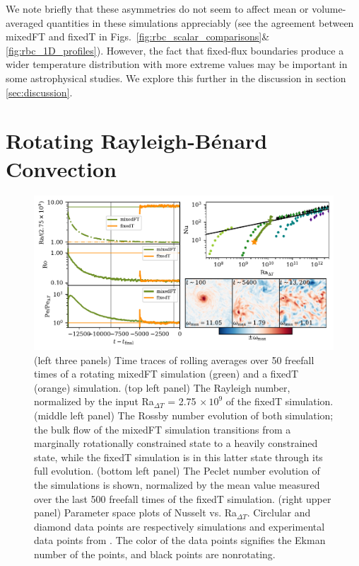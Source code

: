 \documentclass[aps, pre, onecolumn, nofootinbib, notitlepage, groupedaddress, amsfonts, amssymb, amsmath, longbibliography]{revtex4-1}
\newcommand{\RB}{Rayleigh-B\'{e}nard }
\begin{document}
We note briefly that these asymmetries do not seem to affect mean or volume-averaged quantities in these simulations appreciably (see the agreement between mixedFT and fixedT in Figs.~\ref{fig:rbc_scalar_comparisons}\&\ref{fig:rbc_1D_profiles}).
However, the fact that fixed-flux boundaries produce a wider temperature distribution with more extreme values may be important in some astrophysical studies.
We explore this further in the discussion in section \ref{sec:discussion}.





\section{Rotating \RB Convection}
\label{sec:rotating_results}
\begin{figure}
\includegraphics[width=\textwidth]{./figs/rotating_panels.pdf}
\caption{ 
	(left three panels) Time traces of rolling averages over 50 freefall times of a rotating mixedFT simulation (green) and a fixedT (orange) simulation.
	(top left panel) The Rayleigh number, normalized by the input Ra$_{\Delta T}$ = 2.75$\,\times 10^9$ of the fixedT simulation.
	(middle left panel) The Rossby number evolution of both simulation; the bulk flow of the mixedFT simulation transitions from a marginally rotationally constrained state to a heavily constrained state, while the fixedT simulation is in this latter state through its full evolution.
	(bottom left panel) The Peclet number evolution of the simulations is shown, normalized by the mean value measured over the last 500 freefall times of the fixedT simulation.
	(right upper panel) Parameter space plots of Nusselt vs. Ra$_{\Delta T}$.
	Circlular and diamond data points are respectively simulations and experimental data points from \cite{cheng&all2015}.
	The color of the data points signifies the Ekman number of the points, and black points are nonrotating.
}
\end{figure}
\end{document}
